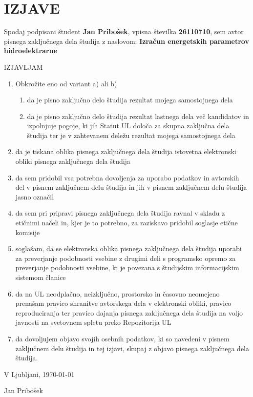 \chapter*{IZJAVE}
\thispagestyle{fancy}

Spodaj podpisani študent \textbf{Jan Pribošek}, vpisna številka \textbf{26110710}, sem avtor pisnega zaključnega dela študija z naslovom: \textbf{Izračun energetskih parametrov hidroelektrarne}

\begin{center}
	IZJAVLJAM
\end{center}

\begin{enumerate}
	\item Obkrožite eno od variant a) ali b)
	
		\begin{enumerate}
			\item da je pisno zaključno delo študija rezultat mojega samostojnega dela
			
			\item da je pisno zaključno delo študija rezultat lastnega dela več kandidatov in izpolnjuje pogoje, ki
			jih Statut UL določa za skupna zaključna dela študija ter je v zahtevanem deležu rezultat
			mojega samostojnega dela
		\end{enumerate}
	
	\item da je tiskana oblika pisnega zaključnega dela študija istovetna elektronski obliki pisnega
	zaključnega dela študija
	
	\item da sem pridobil vsa potrebna dovoljenja za uporabo podatkov in avtorskih del v pisnem
	zaključnem delu študija in jih v pisnem zaključnem delu študija jasno označil
	
	\item da sem pri pripravi pisnega zaključnega dela študija ravnal v skladu z etičnimi načeli in, kjer je to
	potrebno, za raziskavo pridobil soglasje etične komisije
	
	\item soglašam, da se elektronska oblika pisnega zaključnega dela študija uporabi za preverjanje
	podobnosti vsebine z drugimi deli s programsko opremo za preverjanje podobnosti vsebine, ki je
	povezana s študijskim informacijskim sistemom članice
	
	\item da na UL neodplačno, neizključno, prostorsko in časovno neomejeno prenašam pravico shranitve
	avtorskega dela v elektronski obliki, pravico reproduciranja ter pravico dajanja pisnega zaključnega
	dela študija na voljo javnosti na svetovnem spletu preko Repozitorija UL
	
	\item da dovoljujem objavo svojih osebnih podatkov, ki so navedeni v pisnem zaključnem delu študija in
	tej izjavi, skupaj z objavo pisnega zaključnega dela študija.
	
\end{enumerate}

\vfill


V Ljubljani, \today 
\vspace{1cm}

\hspace*{\fill}Jan Pribošek